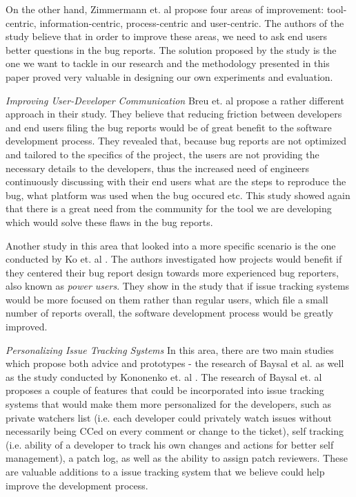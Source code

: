 \documentclass[11pt,english,twocolumn]{article}
\begin{document}
On the other hand, Zimmermann et. al \cite{zimmermann2009improving} propose four areas of 
improvement: tool-centric, information-centric, process-centric and user-centric. The authors
of the study believe that in order to improve these areas, we need to ask end users better 
questions in the bug reports. The solution proposed by the study is the one we want to tackle
in our research and the methodology presented in this paper proved very valuable in designing
our own experiments and evaluation.

\emph{Improving User-Developer Communication} Breu et. al \cite{breu2010information} propose
a rather different approach in their study. They believe that reducing friction between 
developers and end users filing the bug reports would be of great benefit to the software 
development process. They revealed that, because bug reports are not optimized and tailored
to the specifics of the project, the users are not providing the necessary details to the developers,
thus the increased need of engineers continuously discussing with their end users what are the
steps to reproduce the bug, what platform was used when the bug occured etc. This study showed
again that there is a great need from the community for the tool we are developing which would
solve these flaws in the bug reports. 

Another study in this area that looked into a more specific scenario is the one conducted by
Ko et. al \cite{ko2010power}. The authors investigated how projects would benefit if they
centered their bug report design towards more experienced bug reporters, also known as 
\emph{power users}. They show in the study that if issue tracking systems would be more 
focused on them rather than regular users, which file a small number of reports overall, the 
software development process would be greatly improved.

\emph{Personalizing Issue Tracking Systems} In this area, there are two main studies which
propose both advice and prototypes - the research of Baysal et al. \cite{baysal2013situational}
as well as the study conducted by Kononenko et. al \cite{kononenko2014dashboards}. The research
of Baysal et. al \cite{baysal2013situational} proposes a couple of features that could be incorporated into issue tracking
systems that would make them more personalized for the developers, such as private watchers
list (i.e. each developer could privately watch issues without necessarily being CCed on 
every comment or change to the ticket), self tracking (i.e. ability of a developer to track
his own changes and actions for better self management), a patch log, as well as the ability
to assign patch reviewers. These are valuable additions to a issue tracking system that we
believe could help improve the development process. 
\end{document}
